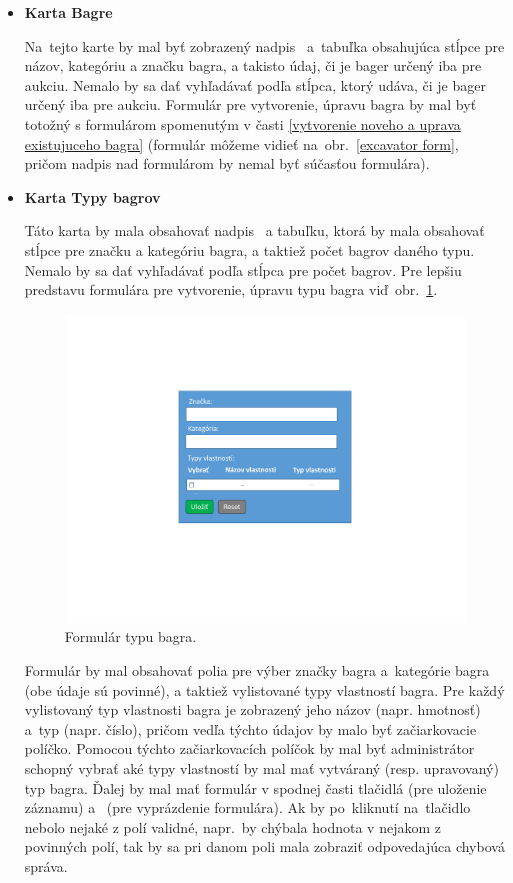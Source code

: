 \begin{itemize}
\item \textbf{Karta Bagre}

Na~tejto karte by mal byť zobrazený nadpis~ a~tabuľka obsahujúca stĺpce pre názov, kategóriu a značku bagra, a takisto údaj, či je bager určený iba pre aukciu. Nemalo by sa dať vyhľadávať podľa stĺpca, ktorý udáva, či je bager určený iba pre aukciu. Formulár pre vytvorenie, úpravu bagra by mal byť totožný s formulárom spomenutým v časti \ref{vytvorenie noveho a uprava existujuceho bagra} (formulár môžeme vidieť na~obr.~\ref{excavator form}, pričom nadpis nad formulárom by nemal byť súčasťou formulára).

\item \textbf{Karta Typy bagrov}

Táto karta by mala obsahovať nadpis~ a tabuľku, ktorá by mala obsahovať stĺpce pre značku a kategóriu bagra, a taktiež počet bagrov daného typu. Nemalo by sa dať vyhľadávať podľa stĺpca pre počet bagrov. Pre lepšiu predstavu formulára pre vytvorenie, úpravu typu bagra viď~obr.~\ref{excavator type form}.

\begin{figure}[H]\centering
\includegraphics[width=140mm]{../img/UI concept/excavator type form}
\caption{Formulár typu bagra.}
\label{excavator type form}
\end{figure}

Formulár by mal obsahovať polia pre výber značky bagra a~kategórie bagra (obe údaje sú povinné), a taktiež vylistované typy vlastností bagra. Pre každý vylistovaný typ vlastnosti bagra je zobrazený jeho názov (napr. hmotnosť) a~typ (napr. číslo), pričom vedľa týchto údajov by malo byť začiarkovacie políčko. Pomocou týchto začiarkovacích políčok by mal byť administrátor schopný vybrať aké typy vlastností by mal mať vytváraný (resp. upravovaný) typ bagra. Ďalej by mal mať formulár v spodnej časti tlačidlá  (pre uloženie záznamu) a~ (pre vyprázdenie formulára). Ak by po~kliknutí na~tlačidlo  nebolo nejaké z polí validné, napr.~by chýbala hodnota v nejakom z povinných polí, tak by sa pri danom poli mala zobraziť odpovedajúca chybová správa.


\end{itemize}
